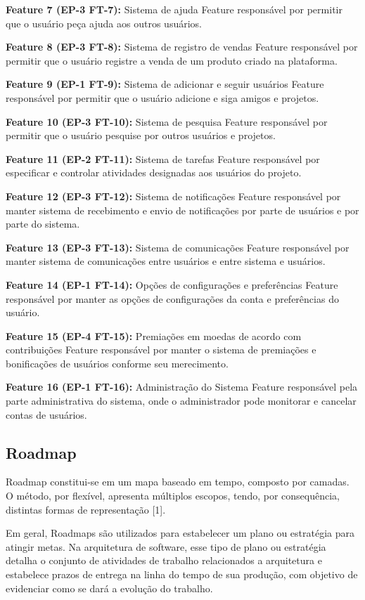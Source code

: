 \textbf{Feature 7 (EP-3 FT-7):} Sistema de ajuda
Feature responsável por permitir que o usuário peça ajuda aos outros usuários.

\textbf{Feature 8 (EP-3 FT-8):} Sistema de registro de vendas
Feature responsável por permitir que o usuário registre a venda de um produto criado na plataforma.

\textbf{Feature 9 (EP-1 FT-9):} Sistema de adicionar e seguir usuários
Feature responsável por permitir que o usuário adicione e siga amigos e projetos.

\textbf{Feature 10 (EP-3 FT-10):} Sistema de pesquisa
Feature responsável por permitir que o usuário pesquise por outros usuários e projetos.

\textbf{Feature 11 (EP-2 FT-11):} Sistema de tarefas
Feature responsável por especificar e controlar atividades designadas aos usuários do projeto.

\textbf{Feature 12 (EP-3 FT-12):} Sistema de notificações
Feature responsável por manter sistema de recebimento e envio de notificações por parte de usuários e por parte do sistema.

\textbf{Feature 13 (EP-3 FT-13):} Sistema de comunicações
Feature responsável por manter sistema de comunicações entre usuários e entre sistema e usuários.

\textbf{Feature 14 (EP-1 FT-14):} Opções de configurações e preferências
Feature responsável por manter as opções de configurações da conta e preferências do usuário.

\textbf{Feature 15 (EP-4 FT-15):} Premiações em moedas de acordo com contribuições
Feature responsável por manter o sistema de premiações e bonificações de usuários conforme seu merecimento.

\textbf{Feature 16 (EP-1 FT-16):} Administração do Sistema
Feature responsável pela parte administrativa do sistema, onde o administrador pode monitorar e cancelar contas de usuários.

\subsection{Roadmap}

Roadmap constitui-se em um mapa baseado em tempo, composto por camadas. O método, por flexível, apresenta múltiplos escopos, tendo, por consequência, distintas formas de representação [1].

Em geral, Roadmaps são utilizados para estabelecer um plano ou estratégia para atingir metas. Na arquitetura de software, esse tipo de plano ou estratégia detalha o conjunto de atividades de trabalho relacionados a arquitetura e estabelece prazos de entrega na linha do tempo de sua produção, com objetivo de evidenciar como se dará a evolução do trabalho.

